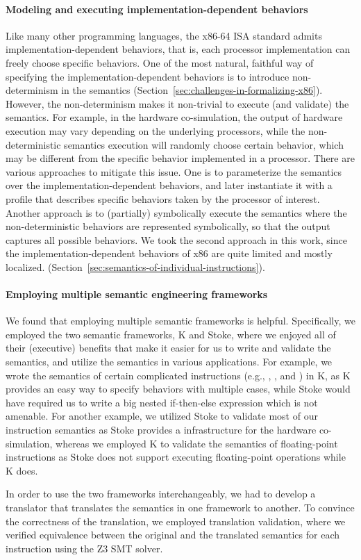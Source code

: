 \paragraph{Modeling and executing implementation-dependent behaviors}

Like many other programming languages, the x86-64 ISA standard admits implementation-dependent behaviors, that is, each processor implementation can freely choose specific behaviors. One of the most natural, faithful way of specifying the implementation-dependent behaviors is to introduce non-determinism in the semantics (Section~\ref{sec:challenges-in-formalizing-x86}). However, the non-determinism makes it non-trivial to execute (and validate) the semantics. For example, in the hardware co-simulation, the output of hardware execution may vary depending on the underlying processors, while the non-deterministic semantics execution will randomly choose certain behavior, which may be different from the specific behavior implemented in a processor. There are various approaches to mitigate this issue. One is to parameterize the semantics over the implementation-dependent behaviors, and later instantiate it with a profile that describes specific behaviors taken by the processor of interest. Another approach is to (partially) symbolically execute the semantics where the non-deterministic behaviors are represented symbolically, so that the output captures all possible behaviors. We took the second approach in this work, since the implementation-dependent behaviors of x86 are quite limited and mostly localized. (Section~\ref{sec:semantics-of-individual-instructions}).

\paragraph{Employing multiple semantic engineering frameworks}

We found that employing multiple semantic frameworks is helpful. Specifically, we employed the two semantic frameworks, K and Stoke, where we enjoyed all of their (executive) benefits that make it easier for us to write and validate the semantics, and utilize the semantics in various applications. For example, we wrote the semantics of certain complicated instructions (e.g., , , and ) in K, as K provides an easy way to specify behaviors with multiple cases, while Stoke would have required us to write a big nested if-then-else expression which is not amenable. For another example, we utilized Stoke to validate most of our instruction semantics as Stoke provides a infrastructure for the hardware co-simulation, whereas we employed K to validate the semantics of floating-point instructions as Stoke does not support executing floating-point operations while K does.

In order to use the two frameworks interchangeably, we had to develop a translator that translates the semantics in one framework to another. To convince the correctness of the translation, we employed translation validation, where we verified equivalence between the original and the translated semantics for each instruction using the Z3 SMT solver.



